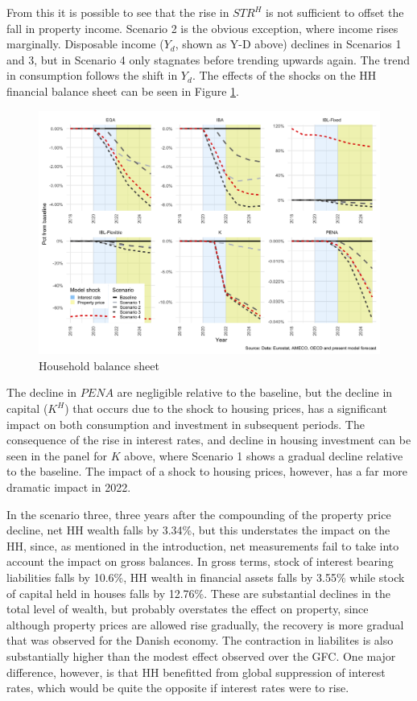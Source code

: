 \documentclass[
]{book}
\begin{document}
From this it is possible to see that the rise in \(STR^H\) is not sufficient to offset the fall in property income. Scenario 2 is the obvious exception, where income rises marginally. Disposable income (\(Y_d\), shown as Y-D above) declines in Scenarios 1 and 3, but in Scenario 4 only stagnates before trending upwards again. The trend in consumption follows the shift in \(Y_d\). The effects of the shocks on the HH financial balance sheet can be seen in Figure \ref{fig:fl-fi-sfc-plot-hh-bs}.

\begin{figure}[H]
\includegraphics[width=0.95\linewidth]{figures/fl-fi-sfc-plot-hh-bs-1} \caption{Household balance sheet}\label{fig:fl-fi-sfc-plot-hh-bs}
\end{figure}

The decline in \(PENA\) are negligible relative to the baseline, but the decline in capital (\(K^H\)) that occurs due to the shock to housing prices, has a significant impact on both consumption and investment in subsequent periods. The consequence of the rise in interest rates, and decline in housing investment can be seen in the panel for \(K\) above, where Scenario 1 shows a gradual decline relative to the baseline. The impact of a shock to housing prices, however, has a far more dramatic impact in 2022.

In the scenario three, three years after the compounding of the property price decline, net HH wealth falls by 3.34\%, but this understates the impact on the HH, since, as mentioned in the introduction, net measurements fail to take into account the impact on gross balances. In gross terms, stock of interest bearing liabilities falls by 10.6\%, HH wealth in financial assets falls by 3.55\% while stock of capital held in houses falls by 12.76\%. These are substantial declines in the total level of wealth, but probably overstates the effect on property, since although property prices are allowed rise gradually, the recovery is more gradual that was observed for the Danish economy. The contraction in liabilites is also substantially higher than the modest effect observed over the GFC. One major difference, however, is that HH benefitted from global suppression of interest rates, which would be quite the opposite if interest rates were to rise.
\end{document}
